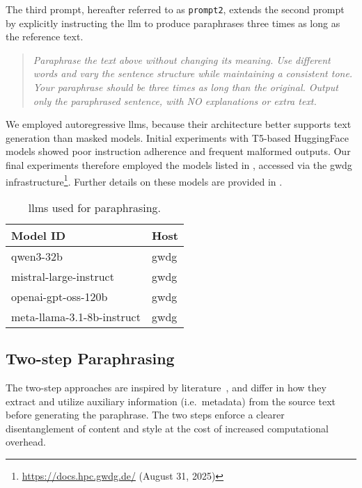 The third prompt, hereafter referred to as \texttt{prompt2}, extends the second prompt by explicitly instructing the \ac{llm} to produce paraphrases three times as long as the reference text.
\begin{quote}
  \textit{Paraphrase the text above without changing its meaning. Use different words and vary the sentence structure while maintaining a consistent tone. Your paraphrase should be three times as long than the original. Output only the paraphrased sentence, with NO explanations or extra text.}
\end{quote}

We employed autoregressive \acp{llm}, because their architecture better supports text generation than masked models.
Initial experiments with T5-based HuggingFace models showed poor instruction adherence and frequent malformed outputs. 
Our final experiments therefore employed the models listed in , accessed via the \ac{gwdg} infrastructure\footnote{\url{https://docs.hpc.gwdg.de/} (August 31, 2025)}.
Further details on these models are provided in .

\begin{table}[h]
\centering
\caption[\acp{llm} used for paraphrasing]{\acp{llm} used for paraphrasing.}
\label{tab:base_llms}
\begin{tabular}{@{}ll@{}}
\toprule
\textbf{Model ID}                    & \textbf{Host} \\
\midrule
qwen3-32b                            & \ac{gwdg}    \\
mistral-large-instruct               & \ac{gwdg}    \\
openai-gpt-oss-120b                  & \ac{gwdg}    \\
meta-llama-3.1-8b-instruct           & \ac{gwdg}    \\
\bottomrule   
\end{tabular}%
\end{table}


\subsection{Two-step Paraphrasing}

The two-step approaches are inspired by literature~\citep{bevendorff_overview_2024, ayele_overview_2024}, and differ in how they extract and utilize auxiliary information (i.e.\ metadata) from the source text before generating the paraphrase. 
The two steps enforce a clearer disentanglement of content and style at the cost of increased computational overhead.

